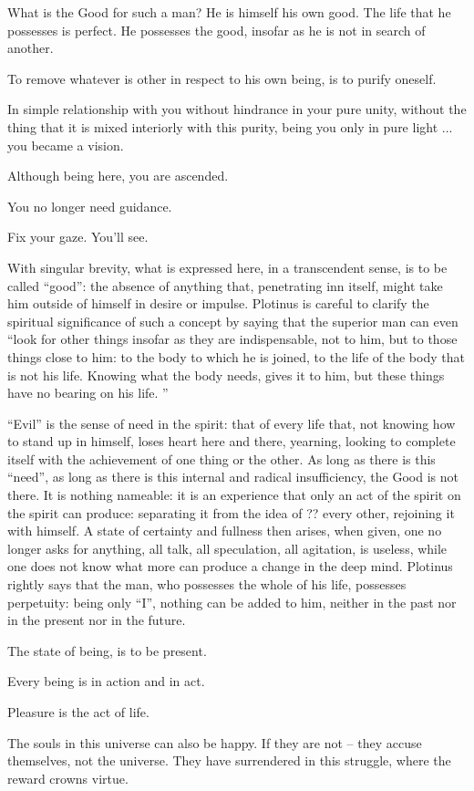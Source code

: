 \begin{quotex}
What is the Good for such a man? He is himself his own good. The life that he possesses is perfect. He possesses the good, insofar as he is not in search of another.

To remove whatever is other in respect to his own being, is to purify oneself.

In simple relationship with you without hindrance in your pure unity, without the thing that it is mixed interiorly with this purity, being you only in pure light ... you became a vision.

Although being here, you are ascended.

You no longer need guidance.

Fix your gaze. You'll see.
\end{quotex}


With singular brevity, what is expressed here, in a transcendent sense, is to be called ``good'': the absence of anything that, penetrating inn itself, might take him outside of himself in desire or impulse. Plotinus is careful to clarify the spiritual significance of such a concept by saying that the superior man can even ``look for other things insofar as they are indispensable, not to him, but to those things close to him: to the body to which he is joined, to the life of the body that is not his life. Knowing what the body needs, gives it to him, but these things have no bearing on his life. ''

``Evil'' is the sense of need in the spirit: that of every life that, not knowing how to stand up in himself, loses heart here and there, yearning, looking to complete itself with the achievement of one thing or the other. As long as there is this ``need'', as long as there is this internal and radical insufficiency, the Good is not there. It is nothing nameable: it is an experience that only an act of the spirit on the spirit can produce: separating it from the idea of ?? every other, rejoining it with himself. A state of certainty and fullness then arises, when given, one no longer asks for anything, all talk, all speculation, all agitation, is useless, while one does not know what more can produce a change in the deep mind. Plotinus rightly says that the man, who possesses the whole of his life, possesses perpetuity: being only ``I'', nothing can be added to him, neither in the past nor in the present nor in the future.

\begin{quotex}
The state of being, is to be present.

Every being is in action and in act.

Pleasure is the act of life.

The souls in this universe can also be happy. If they are not -- they accuse themselves, not the universe. They have surrendered in this struggle, where the reward crowns virtue.
\end{quotex}


